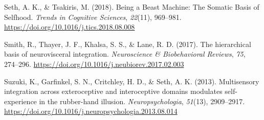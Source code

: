 \documentclass[
  man]{apa6}
\newlength{\cslhangindent}
\newlength{\cslentryspacingunit} %
\newenvironment{CSLReferences}[2] %
 {%
  \setlength{\parindent}{0pt}
  \ifodd #1
  \let\oldpar\par
  \def\par{\hangindent=\cslhangindent\oldpar}
  \fi
  \setlength{\parskip}{#2\cslentryspacingunit}
 }%
 {}
\begin{document}
\begin{CSLReferences}{1}{0}
\leavevmode{}%
Seth, A. K., \& Tsakiris, M. (2018). Being a {Beast} {Machine}: {The} {Somatic} {Basis} of {Selfhood}. \emph{Trends in Cognitive Sciences}, \emph{22}(11), 969--981. \url{https://doi.org/10.1016/j.tics.2018.08.008}

\leavevmode{}%
Smith, R., Thayer, J. F., Khalsa, S. S., \& Lane, R. D. (2017). The hierarchical basis of neurovisceral integration. \emph{Neuroscience \& Biobehavioral Reviews}, \emph{75}, 274--296. \url{https://doi.org/10.1016/j.neubiorev.2017.02.003}

\leavevmode{}%
Suzuki, K., Garfinkel, S. N., Critchley, H. D., \& Seth, A. K. (2013). Multisensory integration across exteroceptive and interoceptive domains modulates self-experience in the rubber-hand illusion. \emph{Neuropsychologia}, \emph{51}(13), 2909--2917. \url{https://doi.org/10.1016/j.neuropsychologia.2013.08.014}

\end{CSLReferences}
\end{document}

